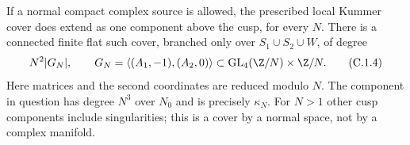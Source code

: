 \begin{theorem}\label{maps:src:C.1.5}


If a normal compact complex source is allowed, the prescribed local
Kummer cover does extend as one component above the cusp, for every $N$.
There is a connected finite flat such cover, branched only over
$S_1\cup S_2\cup W$, of degree
\[
 N^2|G_N|,\qquad
 G_N=\langle(A_1,-1),(A_2,0)\rangle
 \subset\operatorname{GL}_4(\Z/N)\times\Z/N.
 \tag{C.1.4}\label{maps:eq:C.1.4}
\]
Here matrices and the second coordinates are reduced modulo $N$.
The component in question has degree $N^3$ over $N_0$ and is precisely
$\kappa_N$. For $N>1$ other cusp components include singularities;
this is a cover by a normal space, not by a complex manifold.

\end{theorem}



